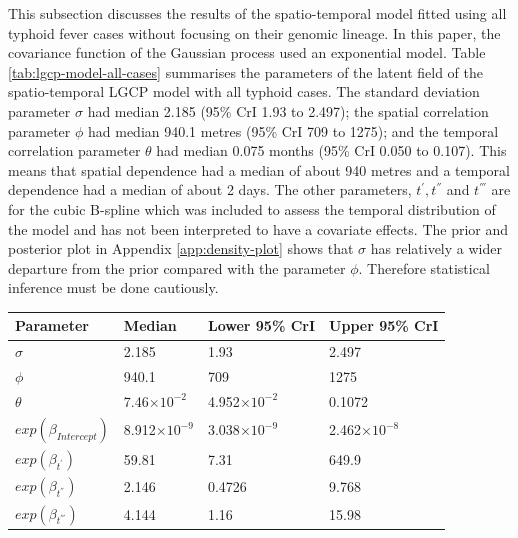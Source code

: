 This subsection discusses the results of the spatio-temporal model fitted using all typhoid fever cases without focusing on their genomic lineage. 
In this paper, the covariance function of the Gaussian process used an exponential model. 
Table \ref{tab:lgcp-model-all-cases} summarises the parameters of the latent field of the spatio-temporal LGCP model with all typhoid cases. 
The standard deviation parameter $\sigma$ had median 2.185 (95\% CrI 1.93 to 2.497); the spatial correlation parameter $\phi$ had median 940.1 metres (95\% CrI 709 to 1275); and the temporal correlation parameter $\theta$ had median 0.075 months (95\% CrI 0.050 to 0.107). 
This means that spatial dependence had a median of about 940 metres and a temporal dependence had a median of about 2 days. 
The other parameters, $t^{'}, t^{''}$ and $t^{'''}$ are for the cubic B-spline which was included to assess the temporal distribution of the model and has not been interpreted to have a covariate effects. The prior and posterior plot in Appendix \ref{app:density-plot} shows that $\sigma$ has relatively a wider departure from the prior compared with the parameter $\phi$. Therefore statistical inference must be done cautiously.

\hspace*{0.2pt}
\addtocounter{table}{-1}

\begin{spacing}{0.85}
      \label{tab:lgcp-model-all-cases}
    \begin{longtable}{p{1.3in}p{1.3in}p{1.3in}p{1.3in}}
        \toprule
        Parameter                & Median               & Lower 95\%  CrI        & Upper 95\%  CrI        \\ \midrule
        $\sigma$                 & 2.185                & 1.93                 & 2.497                \\
        $\phi$                   & 940.1                & 709                  & 1275                 \\
        $\theta$                 & 7.46$\times10^{-2}$  & 4.952$\times10^{-2}$ & 0.1072               \\
        $exp(\beta_{Intercept})$ & 8.912$\times10^{-9}$ & 3.038$\times10^{-9}$ & 2.462$\times10^{-8}$ \\
        $exp(\beta_{t^{'}})$     & 59.81                & 7.31                 & 649.9                \\
        $exp(\beta_{t^{''}})$    & 2.146                & 0.4726               & 9.768                \\
        $exp(\beta_{t^{'''}})$   & 4.144                & 1.16                 & 15.98                \\
        \bottomrule
    \end{longtable}
\end{spacing}



